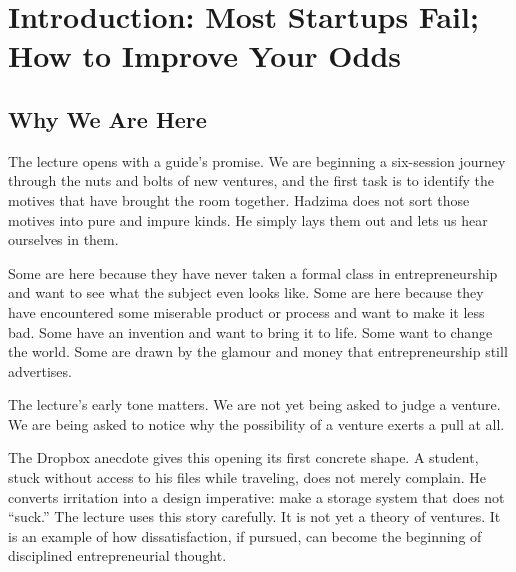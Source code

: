 \chapter{Introduction: Most Startups Fail; How to Improve Your Odds}


\section{Why We Are Here}

The lecture opens with a guide's promise. We are beginning a six-session journey through the nuts and bolts of new ventures, and the first task is to identify the motives that have brought the room together. Hadzima does not sort those motives into pure and impure kinds. He simply lays them out and lets us hear ourselves in them.

Some are here because they have never taken a formal class in entrepreneurship and want to see what the subject even looks like. Some are here because they have encountered some miserable product or process and want to make it less bad. Some have an invention and want to bring it to life. Some want to change the world. Some are drawn by the glamour and money that entrepreneurship still advertises.

The lecture's early tone matters. We are not yet being asked to judge a venture. We are being asked to notice why the possibility of a venture exerts a pull at all.

The Dropbox anecdote gives this opening its first concrete shape. A student, stuck without access to his files while traveling, does not merely complain. He converts irritation into a design imperative: make a storage system that does not ``suck.'' The lecture uses this story carefully. It is not yet a theory of ventures. It is an example of how dissatisfaction, if pursued, can become the beginning of disciplined entrepreneurial thought.

